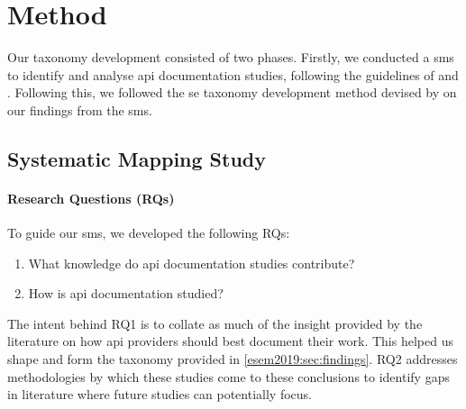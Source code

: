 \section{Method}
\label{esem2019:sec:method}

Our taxonomy development consisted of two phases. Firstly, we conducted a \gls{sms} to identify and analyse \gls{api} documentation studies, following the guidelines of \citet{Kitchenham:2007dd} and \citet{Petersen:2008td}. Following this, we followed the \gls{se} taxonomy development method devised by \citet{Usman:2017hn} on our findings from the \gls{sms}.

\subsection{Systematic Mapping Study}
\label{esem2019:sec:method:lit-review}

\paragraph{Research Questions (RQs)}

To guide our \gls{sms}, we developed the following RQs:

\begin{framed}
\begin{enumerate}[leftmargin=2\parindent,label=\textbf{RQ\arabic*}]
  \item What knowledge do \gls{api} documentation studies contribute?
  \item How is \gls{api} documentation studied?
\end{enumerate}
\end{framed}

The intent behind RQ1 is to collate as much of the insight provided by the literature on how \gls{api} providers should best document their work. This helped us shape and form the taxonomy provided in \cref{esem2019:sec:findings}. RQ2 addresses methodologies by which these studies come to these conclusions to identify gaps in literature where future studies can potentially focus.



